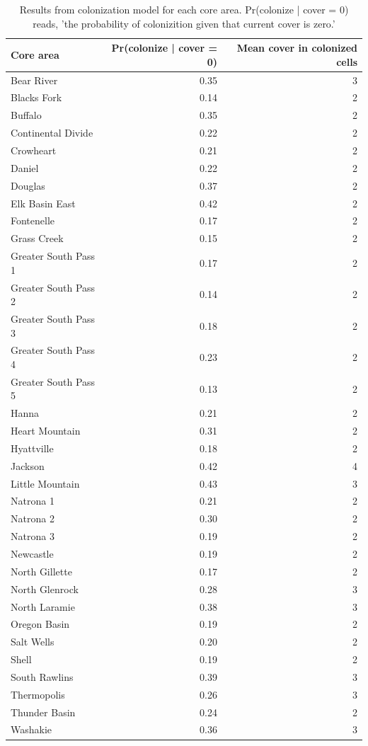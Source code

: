 \documentclass[
  12pt,
]{article}
\begin{document}
\begin{table}

\caption{\label{tab:colonization}Results from colonization model for each core area. Pr(colonize | cover = 0) reads, 'the probability of colonizition given that current cover is zero.'}
\centering
\begin{tabular}[t]{lrr}
\toprule
Core area & Pr(colonize | cover = 0) & Mean cover in colonized cells\\
\midrule
Bear River & 0.35 & 3\\
Blacks Fork & 0.14 & 2\\
Buffalo & 0.35 & 2\\
Continental Divide & 0.22 & 2\\
Crowheart & 0.21 & 2\\
Daniel & 0.22 & 2\\
Douglas & 0.37 & 2\\
Elk Basin East & 0.42 & 2\\
Fontenelle & 0.17 & 2\\
Grass Creek & 0.15 & 2\\
Greater South Pass 1 & 0.17 & 2\\
Greater South Pass 2 & 0.14 & 2\\
Greater South Pass 3 & 0.18 & 2\\
Greater South Pass 4 & 0.23 & 2\\
Greater South Pass 5 & 0.13 & 2\\
Hanna & 0.21 & 2\\
Heart Mountain & 0.31 & 2\\
Hyattville & 0.18 & 2\\
Jackson & 0.42 & 4\\
Little Mountain & 0.43 & 3\\
Natrona 1 & 0.21 & 2\\
Natrona 2 & 0.30 & 2\\
Natrona 3 & 0.19 & 2\\
Newcastle & 0.19 & 2\\
North Gillette & 0.17 & 2\\
North Glenrock & 0.28 & 3\\
North Laramie & 0.38 & 3\\
Oregon Basin & 0.19 & 2\\
Salt Wells & 0.20 & 2\\
Shell & 0.19 & 2\\
South Rawlins & 0.39 & 3\\
Thermopolis & 0.26 & 3\\
Thunder Basin & 0.24 & 2\\
Washakie & 0.36 & 3\\
\bottomrule
\end{tabular}
\end{table}
\end{document}
